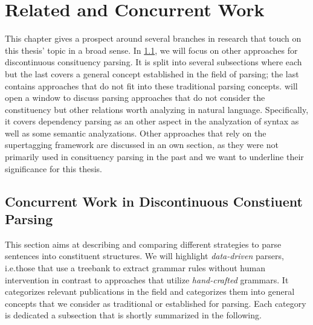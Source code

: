 \documentclass[../document.tex]{subfiles}
\begin{document}
    \chapter{Related and Concurrent Work}\label{sec:literature}
    This chapter gives a prospect around several branches in research that touch on this thesis' topic in a broad sense.
    In \cref{sec:literature:constituency}, we will focus on other approaches for discontinuous consituency parsing.
    It is split into several subsections where each but the last covers a general concept established in the field of parsing; the last contains approaches that do not fit into these traditional parsing concepts.
     will open a window to discuss parsing approaches that do not consider the constituency but other relations worth analyzing in natural language.
    Specifically, it covers dependency parsing as an other aspect in the analyzation of syntax as well as some semantic analyzations.
    Other approaches that rely on the supertagging framework are discussed in an own section, as they were not primarily used in consituency parsing in the past and we want to underline their significance for this thesis.

    \section{Concurrent Work in Discontinuous Constiuent Parsing}\label{sec:literature:constituency}
    This section aims at describing and comparing different strategies to parse sentences into constituent structures.
    We will highlight \emph{data-driven} parsers, i.e.\@ those that use a treebank to extract grammar rules without human intervention \citep[c.f.\@ Section 1.1]{Kal10} in contrast to approaches that utilize \emph{hand-crafted} grammars.
    It categorizes relevant publications in the field and categorizes them into general concepts that we consider as traditional or established for parsing.
    Each category is dedicated a subsection that is shortly summarized in the following.
    
\end{document}
